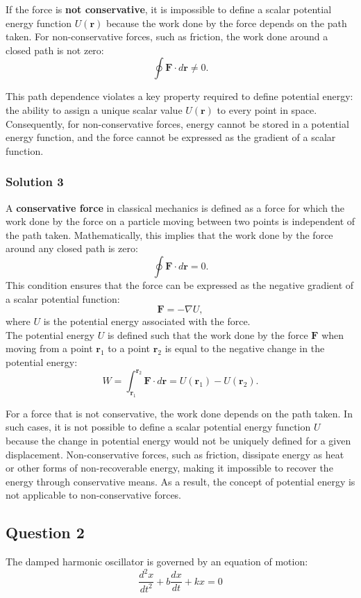 \documentclass{article}
\begin{document}
If the force is \textbf{not conservative}, it is impossible to define a scalar potential energy function $U(\mathbf{r})$ because the work done by the force depends on the path taken. For non-conservative forces, such as friction, the work done around a closed path is not zero:
\[
\oint \mathbf{F} \cdot d\mathbf{r} \neq 0.
\]

This path dependence violates a key property required to define potential energy: the ability to assign a unique scalar value $U(\mathbf{r})$ to every point in space. Consequently, for non-conservative forces, energy cannot be stored in a potential energy function, and the force cannot be expressed as the gradient of a scalar function.

\subsubsection{Solution 3}
A \textbf{conservative force} in classical mechanics is defined as a force for which the work done by the force on a particle moving between two points is independent of the path taken. Mathematically, this implies that the work done by the force around any closed path is zero:
\[
\oint \mathbf{F} \cdot d\mathbf{r} = 0.
\]
This condition ensures that the force can be expressed as the negative gradient of a scalar potential function:
\[
\mathbf{F} = -\nabla U,
\]
where $U$ is the potential energy associated with the force. \\

The potential energy $U$ is defined such that the work done by the force $\mathbf{F}$ when moving from a point $\mathbf{r}_1$ to a point $\mathbf{r}_2$ is equal to the negative change in the potential energy:
\[
W = \int_{\mathbf{r}_1}^{\mathbf{r}_2} \mathbf{F} \cdot d\mathbf{r} = U(\mathbf{r}_1) - U(\mathbf{r}_2).
\]

For a force that is not conservative, the work done depends on the path taken. In such cases, it is not possible to define a scalar potential energy function $U$ because the change in potential energy would not be uniquely defined for a given displacement. Non-conservative forces, such as friction, dissipate energy as heat or other forms of non-recoverable energy, making it impossible to recover the energy through conservative means. As a result, the concept of potential energy is not applicable to non-conservative forces.

\subsection{Question 2}
The damped harmonic oscillator is governed by an equation of motion:
\[
\frac{d^2x}{dt^2} + b\frac{dx}{dt} + kx = 0
\]
\end{document}
